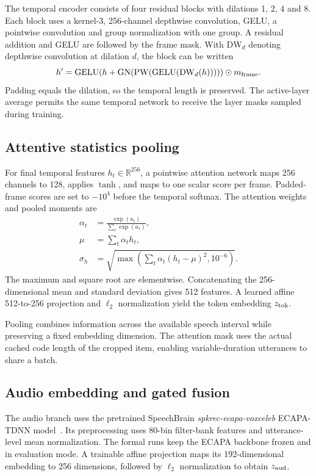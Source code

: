 The temporal encoder consists of four residual blocks with dilations 1, 2, 4 and 8. Each block uses a kernel-3, 256-channel depthwise convolution, GELU, a pointwise convolution and group normalization with one group. A residual addition and GELU are followed by the frame mask. With $\mathrm{DW}_d$ denoting depthwise convolution at dilation $d$, the block can be written
\begin{equation}
 h'=\mathrm{GELU}\!\left(
 h+\mathrm{GN}\!\left(
 \mathrm{PW}(\mathrm{GELU}(\mathrm{DW}_d(h)))
 \right)\right)\odot m_{\rm frame}.
 \label{eq:sv2-temporal}
\end{equation}
Padding equals the dilation, so the temporal length is preserved. The active-layer average permits the same temporal network to receive the layer masks sampled during training.

\subsection{Attentive statistics pooling}
For final temporal features $h_t\in\mathbb{R}^{256}$, a pointwise attention network maps 256 channels to 128, applies $\tanh$, and maps to one scalar score per frame. Padded-frame scores are set to $-10^4$ before the temporal softmax. The attention weights and pooled moments are
\begin{align}
 \alpha_t&=\frac{\exp(a_t)}{\sum_{\tau}\exp(a_\tau)},\nonumber\\
 \mu&=\sum_t\alpha_t h_t,\nonumber\\
 \sigma_h&=\sqrt{\max\left(
           \sum_t\alpha_t(h_t-\mu)^2,10^{-6}\right)}.
 \label{eq:sv2-pooling}
\end{align}
The maximum and square root are elementwise. Concatenating the 256-dimensional mean and standard deviation gives 512 features. A learned affine 512-to-256 projection and $\ell_2$ normalization yield the token embedding $z_{\rm tok}$.

Pooling combines information across the available speech interval while preserving a fixed embedding dimension. The attention mask uses the actual cached code length of the cropped item, enabling variable-duration utterances to share a batch.

\subsection{Audio embedding and gated fusion}
The audio branch uses the pretrained SpeechBrain \textit{spkrec-ecapa-voxceleb} ECAPA-TDNN model~\cite{ecapa}. Its preprocessing uses 80-bin filter-bank features and utterance-level mean normalization. The formal runs keep the ECAPA backbone frozen and in evaluation mode. A trainable affine projection maps its 192-dimensional embedding to 256 dimensions, followed by $\ell_2$ normalization to obtain $z_{\rm aud}$.


